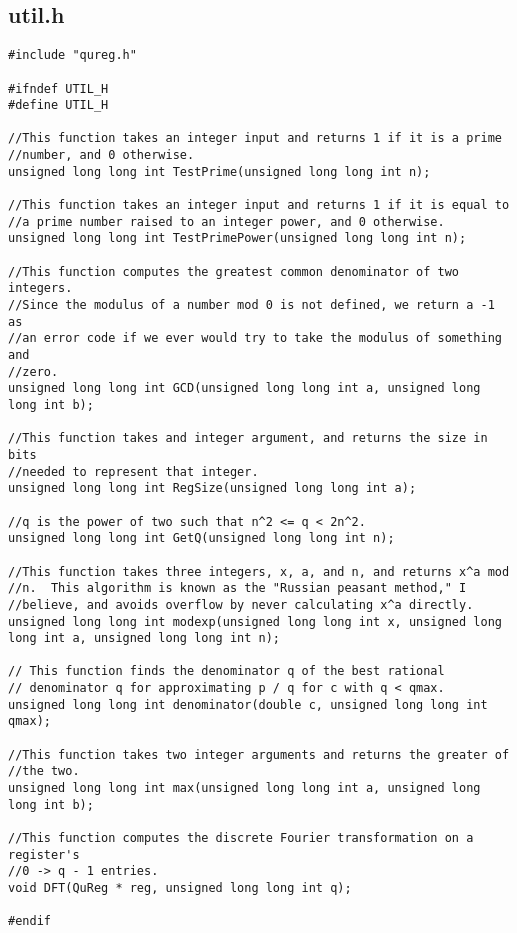 \documentclass[]{article}
\begin{document}
\subsection{util.h}
\begin{verbatim}
#include "qureg.h"

#ifndef UTIL_H
#define UTIL_H

//This function takes an integer input and returns 1 if it is a prime
//number, and 0 otherwise.
unsigned long long int TestPrime(unsigned long long int n);

//This function takes an integer input and returns 1 if it is equal to
//a prime number raised to an integer power, and 0 otherwise.
unsigned long long int TestPrimePower(unsigned long long int n);

//This function computes the greatest common denominator of two integers.
//Since the modulus of a number mod 0 is not defined, we return a -1 as
//an error code if we ever would try to take the modulus of something and
//zero.
unsigned long long int GCD(unsigned long long int a, unsigned long long int b);

//This function takes and integer argument, and returns the size in bits
//needed to represent that integer.
unsigned long long int RegSize(unsigned long long int a);

//q is the power of two such that n^2 <= q < 2n^2.
unsigned long long int GetQ(unsigned long long int n);

//This function takes three integers, x, a, and n, and returns x^a mod
//n.  This algorithm is known as the "Russian peasant method," I
//believe, and avoids overflow by never calculating x^a directly.
unsigned long long int modexp(unsigned long long int x, unsigned long long int a, unsigned long long int n);

// This function finds the denominator q of the best rational
// denominator q for approximating p / q for c with q < qmax.
unsigned long long int denominator(double c, unsigned long long int qmax);

//This function takes two integer arguments and returns the greater of
//the two.
unsigned long long int max(unsigned long long int a, unsigned long long int b);

//This function computes the discrete Fourier transformation on a register's
//0 -> q - 1 entries. 
void DFT(QuReg * reg, unsigned long long int q);

#endif
\end{verbatim}
\end{document}
